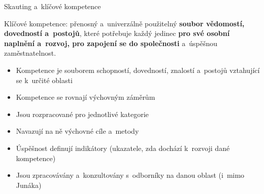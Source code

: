 \documentclass[compress, ucs, xelatex, xcolor=dvipsnames, print,
  hyperref={
    bookmarks=true,
    unicode=true,
    colorlinks=true,
    plainpages=false,
    pdfkeywords={Junak, Pedagogika, Skaut, Skauting, Vychovna metoda},
    linkcolor=Black,
    anchorcolor=Black,
    citecolor=OliveGreen,
    filecolor=OliveGreen,
    menucolor=Black,
    urlcolor=OliveGreen,
    pdftex}
  ]{beamer}
\begin{document}
\begin{frame}{Skauting a~klíčové kompetence}
  \begin{center}
    Klíčové kompetence: přenosný a~univerzálně použitelný \textbf{soubor vědomostí, dovedností a~postojů}, které potřebuje každý jedinec \textbf{pro své osobní naplnění a~rozvoj, pro zapojení se do společnosti} a~úspěšnou zaměstnatelnost.
  \end{center}
  \begin{itemize}
    \item Kompetence je souborem schopností, dovedností, znalostí a~postojů vztahující se k~určité oblasti
    \item Kompetence se rovnají výchovným záměrům
    \item Jsou rozpracované pro jednotlivé kategorie
    \item Navazují na ně výchovné cíle a~metody
    \item Úspěšnost definují indikátory (ukazatele, zda dochází k~rozvoji dané kompetence)
    \item Jsou zpracovávány a~konzultovány s~odborníky na danou oblast (i~mimo Junáka)
  \end{itemize}
\end{frame}
\end{document}
